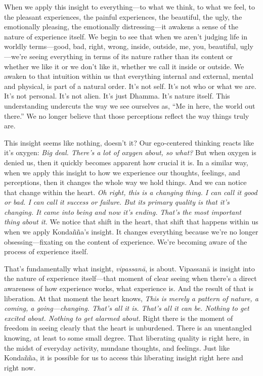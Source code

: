 When we apply this insight to everything---to what we think, to what we 
feel, to the pleasant experiences, the painful experiences, the 
beautiful, the ugly, the emotionally pleasing, the emotionally 
distressing---it awakens a sense of the nature of experience itself. We 
begin to see that when we aren't judging life in worldly terms---good, 
bad, right, wrong, inside, outside, me, you, beautiful, ugly---we're 
seeing everything in terms of its nature rather than its content or 
whether we like it or we don't like it, whether we call it inside or 
outside. We awaken to that intuition within us that everything internal 
and external, mental and physical, is part of a natural order. It's not 
self. It's not who or what we are. It's not personal. It's not alien. 
It's just Dhamma. It's nature itself. This understanding undercuts the 
way we see ourselves as, ``Me in here, the world out there.'' We no 
longer believe that those perceptions reflect the way things truly are.

This insight seems like nothing, doesn't it? Our ego-centered thinking 
reacts like it's oxygen: \emph{Big deal. There's a lot of oxygen about, 
so what?} But when oxygen is denied us, then it quickly becomes 
apparent how crucial it is. In a similar way, when we apply this 
insight to how we experience our thoughts, feelings, and perceptions, 
then it changes the whole way we hold things. And we can notice that 
change within the heart. \emph{Oh right, this is a changing thing. I 
can call it good or bad. I can call it success or failure. But its 
primary quality is that it's changing. It came into being and now it's 
ending.} \emph{That's the most important thing about it.} We notice 
that shift in the heart, that shift that happens within us when we 
apply Kondañña's insight. It changes everything because we're no 
longer obsessing---fixating on the content of experience. We're 
becoming aware of the process of experience itself.

That's fundamentally what insight, \emph{vipassanā}, is about. 
Vipassanā is insight into the nature of experience itself---that 
moment of clear seeing when there's a direct awareness of how 
experience works, what experience is. And the result of that is 
liberation. At that moment the heart knows, \emph{This is merely a 
pattern of nature, a coming, a going---changing. That's all it is. 
That's all it can be. Nothing to get excited about. Nothing to get 
alarmed about.} Right there is the moment of freedom in seeing clearly 
that the heart is unburdened. There is an unentangled knowing, at least 
to some small degree. That liberating quality is right here, in the 
midst of everyday activity, mundane thoughts, and feelings. Just like 
Kondañña, it is possible for us to access this liberating insight 
right here and right now.


